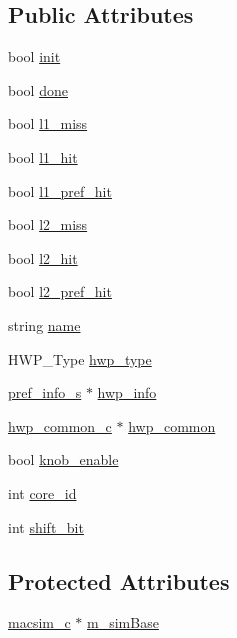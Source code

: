 \subsection*{Public Attributes}
\begin{DoxyCompactItemize}
\item 
bool \hyperlink{classpref__base__c_aae842be24193c5866e6a92b9706da71a}{init}
\item 
bool \hyperlink{classpref__base__c_a0b4fc71dbc57b37b14a3d690641095f8}{done}
\item 
bool \hyperlink{classpref__base__c_af3792920c5d8a07bb4b28d4a30d00450}{l1\_\-miss}
\item 
bool \hyperlink{classpref__base__c_a74726ac22c802880c289bf77dd7b6cca}{l1\_\-hit}
\item 
bool \hyperlink{classpref__base__c_ad687a452e183c6fa0d6dce6371a5dfae}{l1\_\-pref\_\-hit}
\item 
bool \hyperlink{classpref__base__c_a3c4a6b2464e480335b1e5776b4b69bf6}{l2\_\-miss}
\item 
bool \hyperlink{classpref__base__c_a75478fddf153aa4ae23fc7434307dda8}{l2\_\-hit}
\item 
bool \hyperlink{classpref__base__c_a3cd5ebbc80aeee89f7e4287b0ed930e3}{l2\_\-pref\_\-hit}
\item 
string \hyperlink{classpref__base__c_a65b7301bf63f68f8d6c7b893dffa3353}{name}
\item 
HWP\_\-Type \hyperlink{classpref__base__c_a6fb57b9239bf6a8241c0e3e8d67ba95b}{hwp\_\-type}
\item 
\hyperlink{structpref__info__s}{pref\_\-info\_\-s} $\ast$ \hyperlink{classpref__base__c_a4bcc37c2e993a745957630fa8ea8d8e2}{hwp\_\-info}
\item 
\hyperlink{classhwp__common__c}{hwp\_\-common\_\-c} $\ast$ \hyperlink{classpref__base__c_a7e56ec8eb84f475c224c86ceabf858d9}{hwp\_\-common}
\item 
bool \hyperlink{classpref__base__c_ad2b3adaf6b7ae24a519451a67cc4f57f}{knob\_\-enable}
\item 
int \hyperlink{classpref__base__c_ab0093a517b5e4f673a4c497af6ac0658}{core\_\-id}
\item 
int \hyperlink{classpref__base__c_a71a0797d8af664c87de0ebcf7fb36e96}{shift\_\-bit}
\end{DoxyCompactItemize}
\subsection*{Protected Attributes}
\begin{DoxyCompactItemize}
\item 
\hyperlink{classmacsim__c}{macsim\_\-c} $\ast$ \hyperlink{classpref__base__c_ab4840aa16085f9351c4acde5e8232ded}{m\_\-simBase}
\end{DoxyCompactItemize}
